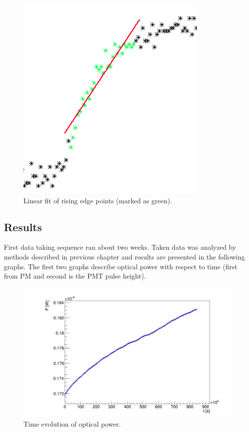 \begin{figure}[H]
 \centering
 \includegraphics[scale=0.65]{./pictures/linFit}
 \caption{Linear fit of rising edge points (marked as green).}
 \label{linfit}
\end{figure}


\subsection{Results}
First data taking sequence ran about two weeks. Taken data was analyzed by methods described in previous chapter and results are presented in the following graphs. The first two graphs describe 
optical power with respect to time (first from PM and second is the PMT pulse height).
\begin{figure}[H]
 \centering
 \includegraphics[scale=0.3]{./pictures/powers}
 \caption{Time evolution of optical power.}
 \label{pow1}
\end{figure}



